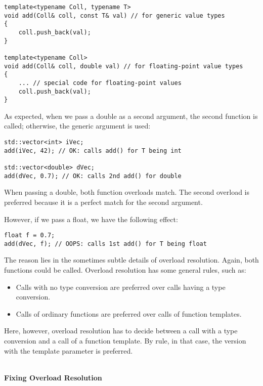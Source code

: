\begin{lstlisting}[style=styleCXX]
template<typename Coll, typename T>
void add(Coll& coll, const T& val) // for generic value types
{
	coll.push_back(val);
}

template<typename Coll>
void add(Coll& coll, double val) // for floating-point value types
{
	... // special code for floating-point values
	coll.push_back(val);
}
\end{lstlisting}

As expected, when we pass a double as a second argument, the second function is called; otherwise, the generic argument is used:

\begin{lstlisting}[style=styleCXX]
std::vector<int> iVec;
add(iVec, 42); // OK: calls add() for T being int

std::vector<double> dVec;
add(dVec, 0.7); // OK: calls 2nd add() for double
\end{lstlisting}

When passing a double, both function overloads match. The second overload is preferred because it is a perfect match for the second argument.

However, if we pass a float, we have the following effect:

\begin{lstlisting}[style=styleCXX]
float f = 0.7;
add(dVec, f); // OOPS: calls 1st add() for T being float
\end{lstlisting}

The reason lies in the sometimes subtle details of overload resolution. Again, both functions could be called. Overload resolution has some general rules, such as:

\begin{itemize}
\item
Calls with no type conversion are preferred over calls having a type conversion.

\item
Calls of ordinary functions are preferred over calls of function templates.
\end{itemize}

Here, however, overload resolution has to decide between a call with a type conversion and a call of a function template. By rule, in that case, the version with the template parameter is preferred.

\noindent
\hspace*{\fill} \\ %
\textbf{Fixing Overload Resolution}

